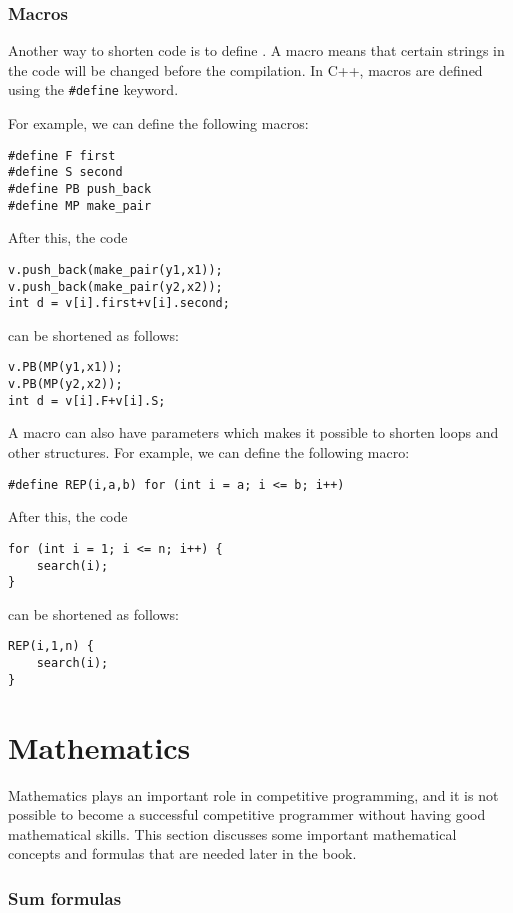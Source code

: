 \subsubsection{Macros}
Another way to shorten code is to define
.
A macro means that certain strings in
the code will be changed before the compilation.
In C++, macros are defined using the
\texttt{\#define} keyword.

For example, we can define the following macros:
\begin{lstlisting}
#define F first
#define S second
#define PB push_back
#define MP make_pair
\end{lstlisting}
After this, the code
\begin{lstlisting}
v.push_back(make_pair(y1,x1));
v.push_back(make_pair(y2,x2));
int d = v[i].first+v[i].second;
\end{lstlisting}
can be shortened as follows:
\begin{lstlisting}
v.PB(MP(y1,x1));
v.PB(MP(y2,x2));
int d = v[i].F+v[i].S;
\end{lstlisting}

A macro can also have parameters
which makes it possible to shorten loops and other
structures.
For example, we can define the following macro:
\begin{lstlisting}
#define REP(i,a,b) for (int i = a; i <= b; i++)
\end{lstlisting}
After this, the code
\begin{lstlisting}
for (int i = 1; i <= n; i++) {
    search(i);
}
\end{lstlisting}
can be shortened as follows:
\begin{lstlisting}
REP(i,1,n) {
    search(i);
}
\end{lstlisting}

\section{Mathematics}

Mathematics plays an important role in competitive
programming, and it is not possible to become
a successful competitive programmer without
having good mathematical skills.
This section discusses some important
mathematical concepts and formulas that
are needed later in the book.

\subsubsection{Sum formulas}

